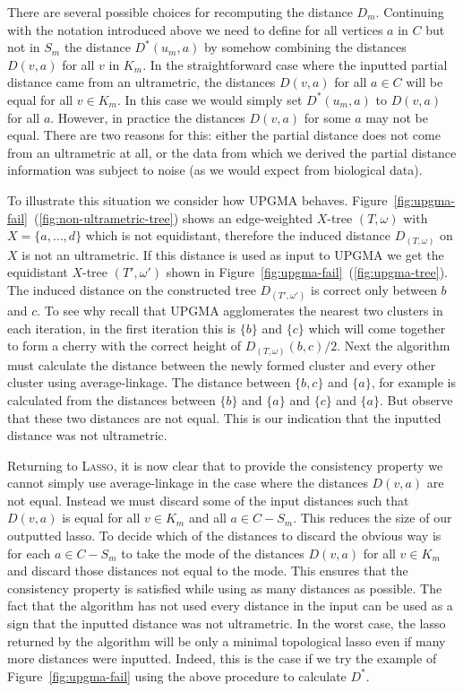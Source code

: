 There are several possible choices for recomputing the distance $D_m$.
Continuing with the notation introduced above we need to define for all
vertices $a$ in $C$ but not in $S_m$ the distance $D^*(u_m,a)$ by somehow
combining the distances $D(v,a)$ for all $v$ in $K_m$.  In the straightforward
case where the inputted partial distance came from an ultrametric, the
distances $D(v,a)$ for all $a \in C$ will be equal for all $v \in K_m$.  In
this case we would simply set $D^*(u_m,a)$ to $D(v,a)$ for all $a$.  However,
in practice the distances $D(v,a)$ for some $a$ may not be equal.  There are
two reasons for this: either the partial distance does not come from an
ultrametric at all, or the data from which we derived the partial distance
information was subject to noise (as we would expect from biological data).

To illustrate this situation we consider how \textsc{UPGMA} behaves.
Figure~\ref{fig:upgma-fail}~(\ref{fig:non-ultrametric-tree}) shows an
edge-weighted $X$-tree $(T,\omega)$ with $X = \{a,\dotsc,d\}$ which is not
equidistant, therefore the induced distance $D_{(T,\omega)}$ on $X$ is not an
ultrametric.  If this distance is used as input to \textsc{UPGMA} we get the
equidistant $X$-tree $(T',\omega')$ shown in
Figure~\ref{fig:upgma-fail}~(\ref{fig:upgma-tree}).  The induced distance on
the constructed tree $D_{(T',\omega')}$ is correct only between $b$ and $c$.
To see why recall that \textsc{UPGMA} agglomerates the nearest two clusters in
each iteration, in the first iteration this is $\{b\}$ and $\{c\}$ which will
come together to form a cherry with the correct height of
$D_{(T,\omega)}(b,c)/2$.  Next the algorithm must calculate the distance
between the newly formed cluster and every other cluster using
average-linkage.  The distance between $\{b,c\}$ and $\{a\}$, for example is
calculated from the distances between $\{b\}$ and $\{a\}$ and $\{c\}$ and
$\{a\}$.  But observe that these two distances are not equal.  This is our
indication that the inputted distance was not ultrametric.

Returning to \textsc{Lasso}, it is now clear that to provide the consistency
property we cannot simply use average-linkage in the case where the distances
$D(v,a)$ are not equal.  Instead we must discard some of the input distances
such that $D(v,a)$ is equal for all $v \in K_m$ and all $a \in C - S_m$.  This
reduces the size of our outputted lasso.  To decide which of the distances to
discard the obvious way is for each $a \in C - S_m$ to take the mode of the
distances $D(v,a)$ for all $v \in K_m$ and discard those distances not equal
to the mode.  This ensures that the consistency property is satisfied while
using as many distances as possible.  The fact that the algorithm has not used
every distance in the input can be used as a sign that the inputted distance
was not ultrametric.  In the worst case, the lasso returned by the algorithm
will be only a minimal topological lasso even if many more distances were
inputted.  Indeed, this is the case if we try the example of
Figure~\ref{fig:upgma-fail} using the above procedure to calculate $D^*$.

